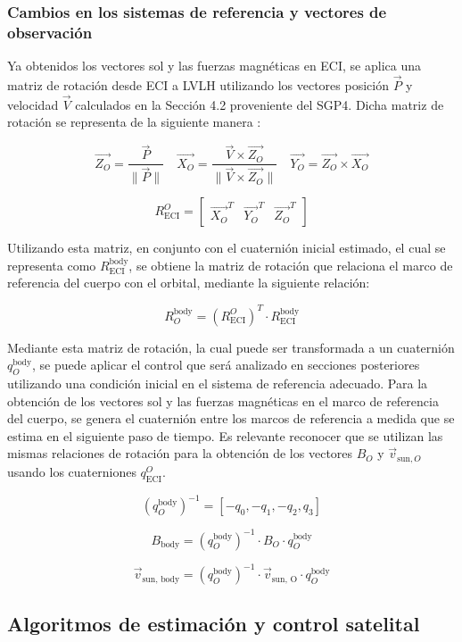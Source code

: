\subsubsection{Cambios en los sistemas de referencia y vectores de observación}

Ya obtenidos los vectores sol y las fuerzas magnéticas en ECI, se aplica una matriz de rotación desde ECI a LVLH utilizando los vectores posición $\vec{P}$ y velocidad $\vec{V}$ calculados en la Sección 4.2 proveniente del SGP4. Dicha matriz de rotación se representa de la siguiente manera \cite{ref9}:

\[
	\vec{Z_O} = \frac{\vec{P}}{\|\vec{P}\|} \quad 	\vec{X_O} = \frac{\vec{V} \times \vec{Z_O}}{\|\vec{V} \times \vec{Z_O}\|} \quad 	\vec{Y_O} = \vec{Z_O} \times \vec{X_O} 
\]

\[
	R_{\text{ECI}}^O = 
	\begin{bmatrix}
		\vec{X_O}^T &
		\vec{Y_O}^T &
		\vec{Z_O}^T
	\end{bmatrix}
\]

Utilizando esta matriz, en conjunto con el cuaternión inicial estimado, el cual se representa como $R_{\text{ECI}}^{\text{body}}$, se obtiene la matriz de rotación que relaciona el marco de referencia del cuerpo con el orbital, mediante la siguiente relación:

\[
	R_O^{\text{body}} = (R_{\text{ECI}}^{O})^T \cdot R_{\text{ECI}}^{\text{body}}
\]

Mediante esta matriz de rotación, la cual puede ser transformada a un cuaternión $q_O^{\text{body}}$, se puede aplicar el control que será analizado en secciones posteriores utilizando una condición inicial en el sistema de referencia adecuado. Para la obtención de los vectores sol y las fuerzas magnéticas en el marco de referencia del cuerpo, se genera el cuaternión entre los marcos de referencia a medida que se estima en el siguiente paso de tiempo. Es relevante reconocer que se utilizan las mismas relaciones de rotación para la obtención de los vectores $B_O$ y $\vec{v}_{\text{sun}, O}$ usando los cuaterniones $q_{\text{ECI}}^{O}$.

\[
	(q_O^{\text{body}})^{-1} = [-q_0, -q_1, -q_2, q_3]
\]

\[
	B_{\text{body}} = (q_O^{\text{body}})^{-1} \cdot B_O \cdot q_O^{\text{body}}
\]

\[
	\vec{v}_{\text{sun, body}} = (q_O^{\text{body}})^{-1} \cdot \vec{v}_{\text{sun, O}} \cdot q_O^{\text{body}}
\]

\subsection{Algoritmos de estimación y control satelital}

